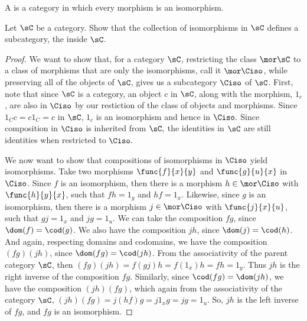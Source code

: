 \documentclass[main.tex]{subfiles}
\begin{document}
\begin{definition}
	A  is a category in which every morphism is an isomorphism.
\end{definition}
\popthm

\begin{exercise}
	Let \(\sC\) be a category. Show that the collection of isomorphisms in
	\(\sC\) defines a subcategory, the  inside \(\sC\).
\end{exercise}

\begin{proof}
	We want to show that, for a category \(\sC\), restricting the class
	\(\mor\sC\) to a class of morphisms that are only the isomorphisms, call it
	\(\mor\Ciso\), while preserving all of the objects of \(\sC\), gives us
	a subcategory \(\Ciso\) of \(\sC\).
	First, note that since $ \sC$ is a category, an object $c$ in $ \sC$,  
	along with the morphism, $1_c$, are also in $ \Ciso$ by our 
	restiction of the class of objects and morphisms. Since $1_Cc = c 1_C = 
	c$ in $ \sC$, $1_c$ is an isomorphism and hence in $ 
	\Ciso.$ Since composition in $ \Ciso $ is inherited from $ \sC,$  the
	identities in $ \sC$ are still identities when restricted to $ \Ciso.$		

	We now want to show that compositions of isomorphisms in \(\Ciso\) yield
	isomorphisms. Take two morphisms \(\func{f}{x}{y}\) and \(\func{g}{u}{x}\)
	in \(\Ciso\). Since \(f\) is an isomorphism, then there is a morphism
	\(h\in\mor\Ciso\) with \(\func{h}{y}{x}\), such that \(fh=1_y\) and
	\(hf=1_x\). Likewise, since \(g\) is an isomorphism, then there is a
	morphism \(j\in\mor\Ciso\) with \(\func{j}{x}{u}\), such that \(gj=1_x\)
	and \(jg=1_u\). We can take the composition \(fg\), since
	\(\dom(f)=\cod(g)\). We also have the composition \(jh\), since
	\(\dom(j)=\cod(h)\). And again, respecting domains and codomains, we have
	the composition \((fg)(jh)\), since \(\dom(fg)=\cod(jh)\). From the
	associativity of the parent category \(\sC\), then
	\((fg)(jh)=f(gj)h=f(1_x)h=fh=1_y\). Thus \(jh\) is the right inverse of the
	composition \(fg\). Similarly, since \(\cod(fg)=\dom(jh)\), we have the
	composition \((jh)(fg)\), which again from the associativity of the category
	\(\sC\), \((jh)(fg)=j(hf)g=j1_xg=jg=1_u\). So, \(jh\) is the left inverse of
	\(fg\), and \(fg\) is an isomorphism.


\end{proof}
\end{document}
